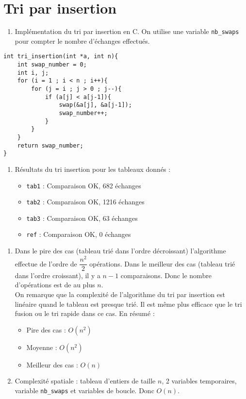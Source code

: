 \documentclass[12pt]{article}
\begin{document}
\section{Tri par insertion}
\begin{enumerate}
    \item Implémentation du tri par insertion en C. On utilise une variable \texttt{nb\_swaps} pour compter le nombre d'échanges effectués.
\end{enumerate}
\begin{lstlisting}[style=languageC, caption=Implémentation du tri par insertion]
int tri_insertion(int *a, int n){
    int swap_number = 0;
    int i, j;
    for (i = 1 ; i < n ; i++){
        for (j = i ; j > 0 ; j--){
            if (a[j] < a[j-1]){
                swap(&a[j], &a[j-1]);
                swap_number++;
            }
        }
    }
    return swap_number;
}
\end{lstlisting}
\begin{enumerate}[resume]
    \item Résultats du tri insertion pour les tableaux donnés :
    \begin{itemize}
        \item \texttt{tab1} : Comparaison OK, 682 échanges
        \item \texttt{tab2} : Comparaison OK, 1216 échanges
        \item \texttt{tab3} : Comparaison OK, 63 échanges
        \item \texttt{ref} : Comparaison OK, 0 échanges
    \end{itemize}
\end{enumerate}

\begin{enumerate}[resume]
    \item Dans le pire des cas (tableau trié dans l'ordre décroissant) l'algorithme effectue de l'ordre de $\dfrac{n^2}{2}$ opérations. Dans le meilleur des cas (tableau trié dans l'ordre croissant), il y a $n-1$ comparaisons. Donc le nombre d'opérations est de au plus $n$. \\
    On remarque que la complexité de l'algorithme du tri par insertion est linéaire quand le tableau est presque trié. Il est même plus efficace que le tri fusion ou le tri rapide dans ce cas.
    En résumé :
    \begin{itemize}
        \item Pire des cas : $O(n^2)$ 
        \item Moyenne : $O(n^2)$
        \item Meilleur des cas : $O(n)$
    \end{itemize}
    \item Complexité spatiale : tableau d'entiers de taille $n$, 2 variables temporaires, variable \texttt{nb\_swaps} et variables de boucle. Donc $O(n)$.
\end{enumerate}
\end{document}

